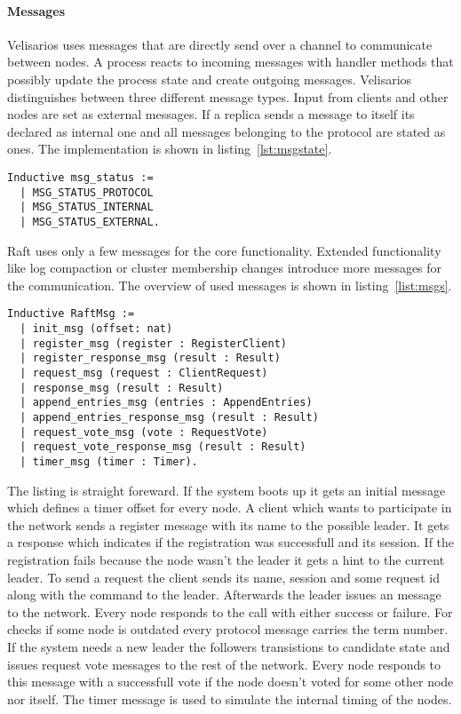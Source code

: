 \paragraph{Messages}
Velisarios uses messages that are directly send over a channel to communicate
between nodes. A process reacts to incoming messages with handler methods that
possibly update the process state and create outgoing messages. Velisarios
distinguishes between three different message types. Input from clients
and other nodes are set as external messages. If a replica sends a message
to itself its declared as internal one and all messages belonging to the
protocol are stated as ones. The implementation is shown in listing~\ref{lst:msgstate}.

\begin{lstlisting}[style=coq,label=lst:msgstate,
caption=Messages have different state informations which are handled by Velisarios.]
  Inductive msg_status :=
  | MSG_STATUS_PROTOCOL
  | MSG_STATUS_INTERNAL
  | MSG_STATUS_EXTERNAL.
\end{lstlisting}

Raft uses only a few messages for the core functionality. Extended functionality
like log compaction or cluster membership changes introduce more messages for
the communication. The overview of used messages is shown in listing~\ref{list:msgs}.

\begin{lstlisting}[style=coq,label=lst:msgs,
caption=Overview of the different messages needed for the core Raft.]
 Inductive RaftMsg :=
  | init_msg (offset: nat)
  | register_msg (register : RegisterClient)
  | register_response_msg (result : Result)
  | request_msg (request : ClientRequest)
  | response_msg (result : Result)
  | append_entries_msg (entries : AppendEntries)
  | append_entries_response_msg (result : Result)
  | request_vote_msg (vote : RequestVote)
  | request_vote_response_msg (result : Result)
  | timer_msg (timer : Timer).
\end{lstlisting}

The listing is straight foreward. If the system boots up it gets
an initial message which defines a timer offset for every node. 
A client which wants to participate in the network sends a register
message with its name to the possible leader. It gets a response
which indicates if the registration was successfull and its session.
If the registration fails because the node wasn't the leader it
gets a hint to the current leader. 
To send a request the client sends its name, session and some request id
along with the command to the leader. Afterwards the leader issues an 
 message to the network. Every node responds to
the call with either success or failure. For checks if some node
is outdated every protocol message carries the term number. 
If the system needs a new leader the followers transistions to
candidate state and issues request vote messages to the rest of the
network. Every node responds to this message with a successfull vote
if the node doesn't voted for some other node nor itself.
The timer message is used to simulate the internal timing of the nodes.

